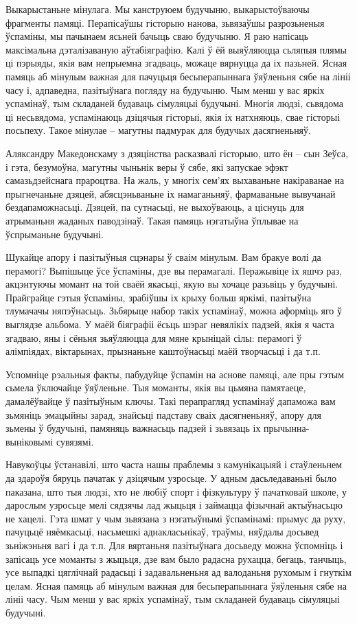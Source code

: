 Выкарыстаньне мінулага. Мы канструюем будучыню, выкарыстоўваючы фрагменты памяці. Перапісаўшы гісторыю нанова, зьвязаўшы разрозьненыя ўспаміны, мы пачынаем ясьней бачыць сваю будучыню. Я раю напісаць максімальна дэталізаваную аўтабіяграфію. Калі ў ёй выяўляюцца сьляпыя плямы ці пэрыяды, якія вам непрыемна згадваць, можаце вярнуцца да іх пазьней. Ясная памяць аб мінулым важная для пачуцьця бесьперапыннага ўяўленьня сябе на лініі часу і, адпаведна, пазітыўнага погляду на будучыню. Чым менш у вас яркіх успамінаў, тым складаней будаваць сімуляцыі будучыні. Многія людзі, сьвядома ці несьвядома, успамінаюць дзіцячыя гісторыі, якія іх натхняюць, свае гісторыі посьпеху. Такое мінулае – магутны падмурак для будучых дасягненьняў.

Аляксандру Македонскаму з дзяцінства расказвалі гісторыю, што ён – сын Зеўса, і гэта, безумоўна, магутны чыньнік веры ў сябе, які запускае эфэкт самазьдзейснага прароцтва. На жаль, у многіх сем'ях выхаваньне накіраванае на прыгнечаньне дзяцей, абясцэньваньне іх намаганьняў, фармаваньне вывучанай бездапаможнасьці. Дзяцей, па сутнасьці, не выхоўваюць, а ціснуць для атрыманьня жаданых паводзінаў. Такая памяць нэгатыўна ўплывае на ўспрыманьне будучыні.

Шукайце апору і пазітыўныя сцэнары ў сваім мінулым. Вам бракуе волі да перамогі? Выпішыце ўсе ўспаміны, дзе вы перамагалі. Перажывіце іх яшчэ раз, акцэнтуючы момант на той сваёй якасьці, якую вы хочаце разьвіць у будучыні. Прайграйце гэтыя ўспаміны, зрабіўшы іх крыху больш яркімі, пазітыўна тлумачачы няпэўнасьць. Зьбярыце набор такіх успамінаў, можна аформіць яго ў выглядзе альбома. У маёй біяграфіі ёсьць шэраг невялікіх падзей, якія я часта згадваю, яны і сёньня зьяўляюцца для мяне крыніцай сілы: перамогі ў алімпіядах, віктарынах, прызнаньне каштоўнасьці маёй творчасьці і да т.п.

Успомніце рэальныя факты, пабудуйце ўспамін на аснове памяці, але пры гэтым сьмела ўключайце ўяўленьне. Тыя моманты, якія вы цьмяна памятаеце, дамалёўвайце ў пазітыўным ключы. Такі перапрагляд успамінаў дапаможа вам зьмяніць эмацыйны зарад, знайсьці падставу сваіх дасягненьняў, апору для зьмены ў будучыні, памяняць важнасьць падзей і зьвязаць іх прычынна-выніковымі сувязямі.

Навукоўцы ўстанавілі, што часта нашы праблемы з камунікацыяй і стаўленьнем да здароўя бяруць пачатак у дзіцячым узросьце. У адным дасьледаваньні было паказана, што тыя людзі, хто не любіў спорт і фізкультуру ў пачатковай школе, у дарослым узросьце мелі сядзячы лад жыцьця і займацца фізычнай актыўнасьцю не хацелі. Гэта шмат у чым зьвязана з нэгатыўнымі ўспамінамі: прымус да руху, пачуцьцё няёмкасьці, насьмешкі аднакласьнікаў, траўмы, няўдалы досьвед зьніжэньня вагі і да т.п. Для вяртаньня пазітыўнага досьведу можна ўспомніць і запісаць усе моманты з жыцьця, дзе вам было радасна рухацца, бегаць, танчыць, усе выпадкі цяглічнай радасьці і задавальненьня ад валоданьня рухомым і гнуткім целам. Ясная памяць аб мінулым важная для бесьперапыннага ўяўленьня сябе на лініі часу. Чым менш у вас яркіх успамінаў, тым складаней будаваць сімуляцыі будучыні.

